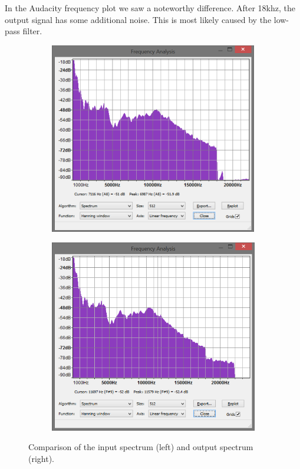 \documentclass[a4paper,twoside,11pt, fleqn]{article}
\begin{document}
In the Audacity frequency plot we saw a noteworthy difference. After 18khz, the output signal has some additional noise. This is most likely caused by the low-pass filter.

\begin{figure}[h]
	\begin{subfigure}[b]{0.6\textwidth}	
		\includegraphics[scale=0.5]{Images/simulation_frequencyspectrum_input.png}
	\end{subfigure}
	\begin{subfigure}[b]{0.6\textwidth}	
		\includegraphics[scale=0.5]{Images/simulation_frequencyspectrum_output.png}
	\end{subfigure}
    \caption{Comparison of the input spectrum (left) and output spectrum (right).}
\end{figure}
\clearpage
\end{document}
